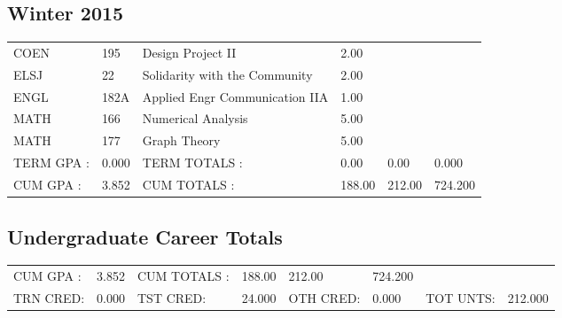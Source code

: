 \documentclass{article}\usepackage[T1]{fontenc}
\begin{document}
\subsection{Winter 2015}
\begin{tabu}{ l  l  l  l  l  l }
COEN&195&Design Project II&2.00&&\\
ELSJ&22&Solidarity with the Community&2.00&&\\
ENGL&182A&Applied Engr Communication IIA&1.00&&\\
MATH&166&Numerical Analysis&5.00&&\\
MATH&177&Graph Theory&5.00&&\\
\hline
TERM GPA :&0.000&TERM TOTALS :&0.00&0.00&0.000\\
CUM GPA :&3.852&CUM TOTALS :&188.00&212.00&724.200\\\end{tabu}
\subsection{Undergraduate Career Totals}
\begin{tabu}{ l  l  l  l  l  l  l  l }
CUM GPA :&3.852&CUM TOTALS :&188.00&212.00&724.200&&\\
TRN CRED:&0.000&TST CRED:&24.000&OTH CRED:&0.000&TOT UNTS:&212.000\\\end{tabu}
\end{document}
